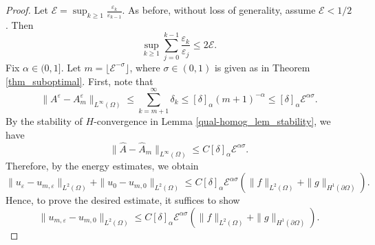 \documentclass[reqno,12pt]{amsart} %
\theoremstyle{definition}
\theoremstyle{remark}
\numberwithin{equation}{section}
\newcommand{\e}{\varepsilon}
\begin{document}
\begin{proof}
    Let $\mathcal{E} = \sup_{k\ge 1} \frac{\e_k}{\e_{k-1}}$. As before, without loss of generality, assume $\mathcal{E} < 1/2$. Then
    \begin{equation*}
        \sup_{k\ge 1} \sum_{j=0}^{k-1} \frac{\e_k}{\e_j} \le 2\mathcal{E}.
    \end{equation*}
    Fix $\alpha \in (0,1]$. Let $m = \lfloor \mathcal{E}^{-\sigma} \rfloor$, where $\sigma \in (0,1)$ is given as in Theorem \ref{thm_suboptimal}. First, note that
    \begin{equation*}
        \| A^\e - A_m^\e \|_{L^\infty(\Omega)} \le \sum_{k=m+1}^\infty \delta_k \le [\delta]_\alpha (m+1)^{-\alpha} \le [\delta]_\alpha \mathcal{E}^{\alpha \sigma}.
    \end{equation*}
    By the stability of $H$-convergence in Lemma \ref{qual-homog_lem_stability}, we have
    \begin{equation*}
        \| \widehat{A} - \widehat{A}_m \|_{L^\infty(\Omega)} \le C [\delta]_\alpha \mathcal{E}^{\alpha \sigma}.
    \end{equation*}
    Therefore, by the energy estimates, we obtain
    \begin{equation*}
        \| u_\e - u_{m,\e} \|_{L^2(\Omega)} + \| u_0 - u_{m,0} \|_{L^2(\Omega)} \le C [\delta]_\alpha \mathcal{E}^{\alpha \sigma} (\|f\|_{L^2(\Omega)}+\|g\|_{H^1(\partial\Omega)}).
    \end{equation*}
    Hence, to prove the desired estimate, it suffices to show
    \begin{equation}\label{est.um}
        \| u_{m,\e} - u_{m,0} \|_{L^2(\Omega)} \le C [\delta]_\alpha \mathcal{E}^{\alpha \sigma} (\|f\|_{L^2(\Omega)}+\|g\|_{H^1(\partial\Omega)}).
    \end{equation}


\end{proof}
\end{document}
